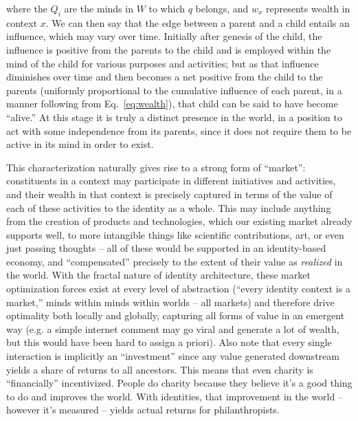 \documentclass[pra,twocolumn,groupedaddress,10pt]{revtex4}
\theoremstyle{definition}
\begin{document}
where the $Q_{i}$ are the minds in $W$ to which $q$ belongs, and $w_{x}$ represents wealth in context $x$. We can then say that the edge between a parent and a child entails an influence, which may vary over time. Initially after genesis of the child, the influence is positive from the parents to the child and is employed within the mind of the child for various purposes and activities; but as that influence diminishes over time and then becomes a net positive from the child to the parents (uniformly proportional to the cumulative influence of each parent, in a manner following from Eq.~\ref{eq:wealth}), that child can be said to have become ``alive.'' At this stage it is truly a distinct presence in the world, in a position to act with some independence from its parents, since it does not require them to be active in its mind in order to exist.

This characterization naturally gives rise to a strong form of ``market'': constituents in a context may participate in different initiatives and activities, and their wealth in that context is precisely captured in terms of the value of each of these activities to the identity as a whole. This may include anything from the creation of products and technologies, which our existing market already supports well, to more intangible things like scientific contributions, art, or even just passing thoughts -- all of these would be supported in an identity-based economy, and ``compensated'' precisely to the extent of their value as \textit{realized} in the world. With the fractal nature of identity architecture, these market optimization forces exist at every level of abstraction (``every identity context is a market,'' minds within minds within worlds -- all markets) and therefore drive optimality both locally and globally, capturing all forms of value in an emergent way (e.g. a simple internet comment may go viral and generate a lot of wealth, but this would have been hard to assign a priori). Also note that every single interaction is implicitly an ``investment'' since any value generated downstream yields a share of returns to all ancestors. This means that even charity is ``financially'' incentivized. People do charity because they believe it's a good thing to do and improves the world. With identities, that improvement in the world -- however it's measured -- yields actual returns for philanthropists.
\end{document}
